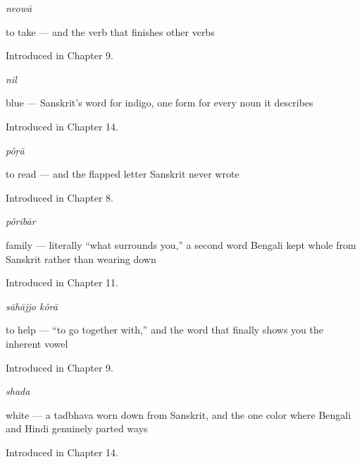\noindent\begin{minipage}[t]{\linewidth}
\raggedright
\textbf{}\enspace\emph{neowā}\par
\small to take — and the verb that finishes other verbs\par
\footnotesize Introduced in Chapter 9.
\end{minipage}\par\medskip

\noindent\begin{minipage}[t]{\linewidth}
\raggedright
\textbf{}\enspace\emph{nil}\par
\small blue — Sanskrit's word for indigo, one form for every noun it describes\par
\footnotesize Introduced in Chapter 14.
\end{minipage}\par\medskip

\noindent\begin{minipage}[t]{\linewidth}
\raggedright
\textbf{}\enspace\emph{pôṛā}\par
\small to read — and the flapped letter Sanskrit never wrote\par
\footnotesize Introduced in Chapter 8.
\end{minipage}\par\medskip

\noindent\begin{minipage}[t]{\linewidth}
\raggedright
\textbf{}\enspace\emph{pôribār}\par
\small family — literally \textquotedblleft{}what surrounds you,\textquotedblright{} a second word Bengali kept whole from Sanskrit rather than wearing down\par
\footnotesize Introduced in Chapter 11.
\end{minipage}\par\medskip

\noindent\begin{minipage}[t]{\linewidth}
\raggedright
\textbf{ }\enspace\emph{sāhājjo kôrā}\par
\small to help — \textquotedblleft{}to go together with,\textquotedblright{} and the word that finally shows you the inherent vowel\par
\footnotesize Introduced in Chapter 9.
\end{minipage}\par\medskip

\noindent\begin{minipage}[t]{\linewidth}
\raggedright
\textbf{}\enspace\emph{shada}\par
\small white — a tadbhava worn down from Sanskrit, and the one color where Bengali and Hindi genuinely parted ways\par
\footnotesize Introduced in Chapter 14.
\end{minipage}\par\medskip

